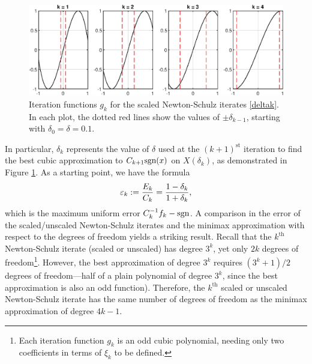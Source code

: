 \begin{figure}[t!]
\centering
   \includegraphics[width=\textwidth,height=\textheight,keepaspectratio]{figures/chapter_3/COMPSIGNiterationfunctions.eps}
   \caption{Iteration functions $g_k$ for the scaled Newton-Schulz iterates \eqref{deltak}. In each plot, the dotted red lines show the values of $\pm \delta_{k-1}$, starting with $\delta_0=\delta=0.1$.}
   \label{fig:compsigniterationfunctions}
\end{figure}

In particular, $\delta_k$ represents the value of $\delta$ used at the $(k+1)^{\text{st}}$ iteration to find the best cubic approximation to $C_{k+1} \text{sgn}(x)$ on $X(\delta_k)$, as demonstrated in Figure \ref{fig:compsigniterationfunctions}. As a starting point, we have the formula
\[\varepsilon_k:=\dfrac{E_k}{C_k}=\dfrac{1-\delta_k}{1+\delta_k},\]
which is the maximum uniform error $C_k^{-1}f_k-\text{sgn}$. A comparison in the error of the scaled/unscaled Newton-Schulz iterates and the minimax approximation with respect to the degrees of freedom yields a striking result. Recall that the $k^{\text{th}}$ Newton-Schulz iterate (scaled or unscaled) has degree $3^k$, yet only $2k$ degrees of freedom\footnote{Each iteration function $g_k$ is an odd cubic polynomial, needing only two coefficients in terms of $\xi_k$ to be defined.}. However, the best approximation of degree $3^k$ requires $(3^k+1)/2$ degrees of freedom---half of a plain polynomial of degree $3^k$, since the best approximation is also an odd function). Therefore, the $k^\text{th}$ scaled or unscaled Newton-Schulz iterate has the same number of degrees of freedom as the minimax approximation of degree $4k-1$. 

\bigskip{}


